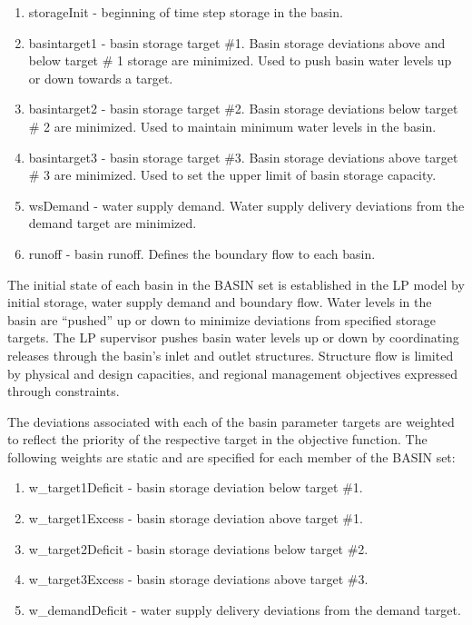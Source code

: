 \begin{enumerate}
 
 \item storageInit \-- beginning of time step storage in the basin.

 \item basintarget1 \-- basin storage target \#1.  Basin storage
   deviations above and below target \# 1 storage are minimized.  Used
   to push basin water levels up or down towards a target.

 \item basintarget2 \-- basin storage target \#2.  Basin storage
   deviations below target \# 2 are minimized.  Used to maintain
   minimum water levels in the basin.

 \item basintarget3 \-- basin storage target \#3.  Basin storage
   deviations above target \# 3 are minimized.  Used to set the upper
   limit of basin storage capacity.

 \item wsDemand \-- water supply demand.  Water supply delivery
   deviations from the demand target are minimized.

 \item runoff \-- basin runoff.  Defines the boundary flow to each
   basin.

\end{enumerate}

The initial state of each basin in the BASIN set is established in the
LP model by initial storage, water supply demand and boundary flow.
Water levels in the basin are ``pushed'' up or down to minimize
deviations from specified storage targets. The LP supervisor pushes
basin water levels up or down by coordinating releases through the
basin's inlet and outlet structures.  Structure flow is limited by
physical and design capacities, and regional management objectives
expressed through constraints.

The deviations associated with each of the basin parameter targets are
weighted to reflect the priority of the respective target in the
objective function.  The following weights are static and are
specified for each member of the BASIN set:

\begin{enumerate}
 
 \item w\_target1Deficit \-- basin storage deviation below target \#1.

 \item w\_target1Excess \-- basin storage deviation above target \#1.

 \item w\_target2Deficit \-- basin storage deviations below target \#2.

 \item w\_target3Excess \-- basin storage deviations above target \#3.

 \item w\_demandDeficit \-- water supply delivery deviations from the
   demand target.

\end{enumerate}

